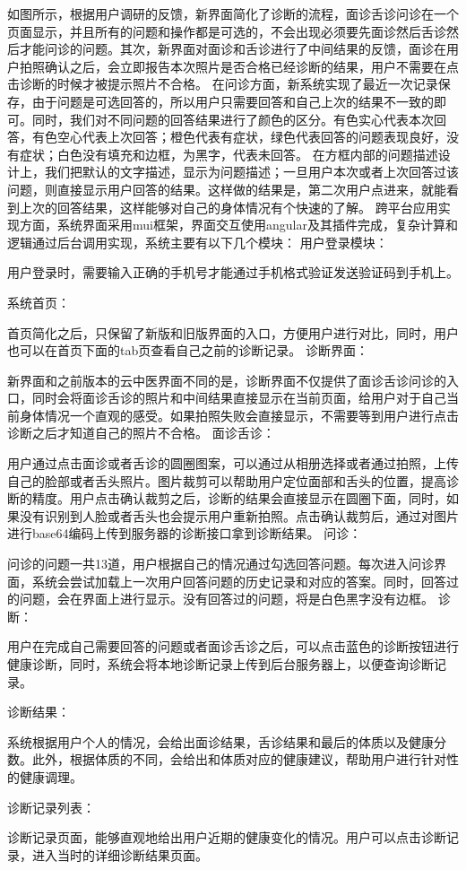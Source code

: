 如图所示，根据用户调研的反馈，新界面简化了诊断的流程，面诊舌诊问诊在一个页面显示，并且所有的问题和操作都是可选的，不会出现必须要先面诊然后舌诊然后才能问诊的问题。其次，新界面对面诊和舌诊进行了中间结果的反馈，面诊在用户拍照确认之后，会立即报告本次照片是否合格已经诊断的结果，用户不需要在点击诊断的时候才被提示照片不合格。
在问诊方面，新系统实现了最近一次记录保存，由于问题是可选回答的，所以用户只需要回答和自己上次的结果不一致的即可。同时，我们对不同问题的回答结果进行了颜色的区分。有色实心代表本次回答，有色空心代表上次回答；橙色代表有症状，绿色代表回答的问题表现良好，没有症状；白色没有填充和边框，为黑字，代表未回答。
在方框内部的问题描述设计上，我们把默认的文字描述，显示为问题描述；一旦用户本次或者上次回答过该问题，则直接显示用户回答的结果。这样做的结果是，第二次用户点进来，就能看到上次的回答结果，这样能够对自己的身体情况有个快速的了解。
跨平台应用实现方面，系统界面采用mui框架，界面交互使用angular及其插件完成，复杂计算和逻辑通过后台调用实现，系统主要有以下几个模块：
用户登录模块：
 
用户登录时，需要输入正确的手机号才能通过手机格式验证发送验证码到手机上。
 
系统首页：
 
首页简化之后，只保留了新版和旧版界面的入口，方便用户进行对比，同时，用户也可以在首页下面的tab页查看自己之前的诊断记录。
诊断界面：
 
	新界面和之前版本的云中医界面不同的是，诊断界面不仅提供了面诊舌诊问诊的入口，同时会将面诊舌诊的照片和中间结果直接显示在当前页面，给用户对于自己当前身体情况一个直观的感受。如果拍照失败会直接显示，不需要等到用户进行点击诊断之后才知道自己的照片不合格。
面诊舌诊：
 
用户通过点击面诊或者舌诊的圆圈图案，可以通过从相册选择或者通过拍照，上传自己的脸部或者舌头照片。图片裁剪可以帮助用户定位面部和舌头的位置，提高诊断的精度。用户点击确认裁剪之后，诊断的结果会直接显示在圆圈下面，同时，如果没有识别到人脸或者舌头也会提示用户重新拍照。点击确认裁剪后，通过对图片进行base64编码上传到服务器的诊断接口拿到诊断结果。
问诊：
 
问诊的问题一共13道，用户根据自己的情况通过勾选回答问题。每次进入问诊界面，系统会尝试加载上一次用户回答问题的历史记录和对应的答案。同时，回答过的问题，会在界面上进行显示。没有回答过的问题，将是白色黑字没有边框。
诊断：


用户在完成自己需要回答的问题或者面诊舌诊之后，可以点击蓝色的诊断按钮进行健康诊断，同时，系统会将本地诊断记录上传到后台服务器上，以便查询诊断记录。

诊断结果：
 
系统根据用户个人的情况，会给出面诊结果，舌诊结果和最后的体质以及健康分数。此外，根据体质的不同，会给出和体质对应的健康建议，帮助用户进行针对性的健康调理。

诊断记录列表：
 
诊断记录页面，能够直观地给出用户近期的健康变化的情况。用户可以点击诊断记录，进入当时的详细诊断结果页面。